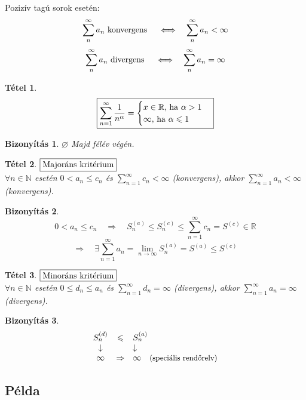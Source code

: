 \documentclass[a4paper,12pt,twoside]{book}
\newtheorem{tetel}{Tétel}[chapter]
\theoremstyle{break}
\newtheorem{biz}{Bizonyítás}[chapter]
\theoremstyle{plain}
\begin{document}
Pozizív tagú sorok esetén:
\[\sum^\infty_{n} a_n \hbox{ konvergens } \quad \Longleftrightarrow \quad \sum^\infty_{n} a_n < \infty\]
\[\sum^\infty_{n} a_n \hbox{ divergens } \quad \Longleftrightarrow \quad \sum^\infty_{n} a_n = \infty\]

\begin{tetel}
\[\boxed{ \sum^\infty_{n=1} \frac{1}{n^\alpha} = \begin{cases}
   x\in\mathbb{R} \hbox{, ha } \alpha > 1 \\
   \infty \hbox{, ha } \alpha \leqslant 1
\end{cases}}\]
\end{tetel}
\begin{biz}$\varnothing$ Majd félév végén.\end{biz}

\begin{tetel}$\boxed{$Majoráns kritérium$}$\\
$\forall n\in\mathbb{N}$ esetén $0<a_n\leqslant c_n$ és $\displaystyle\sum^\infty_{n=1} c_n < \infty$ (konvergens), akkor $\displaystyle\sum^\infty_{n=1} a_n < \infty$ (konvergens).
\end{tetel}
\begin{biz}
\[0<a_n\leqslant c_n \quad \Rightarrow \quad S_n^{(a)} \leqslant S_n^{(c)} \leqslant \sum^\infty_{n=1} c_n = S^{(c)} \in \mathbb{R}\]
\[\Rightarrow \quad \exists \sum^\infty_{n=1} a_n = \lim_{n\to\infty} S_n^{(a)} = S^{(a)} \leqslant S^{(c)}\]
\end{biz}


\begin{tetel}$\boxed{$Minoráns kritérium$}$\\
 $\forall n\in\mathbb{N}$ esetén $0\leqslant d_n\leqslant a_n$ és $\displaystyle\sum^\infty_{n=1} d_n = \infty$ (divergens), akkor $\displaystyle\sum^\infty_{n=1} a_n = \infty$ (divergens).
\end{tetel}
\begin{biz}
 \[\begin{array}{ccl}
    S_n^{(d)} & \leqslant & S_n^{(a)}\\
    \downarrow & & \downarrow \\
    \infty & \Rightarrow & \infty \quad \hbox{\small(speciális rendőrelv)}
   \end{array}\]
\end{biz}

\subsection{Példa}
\end{document}
